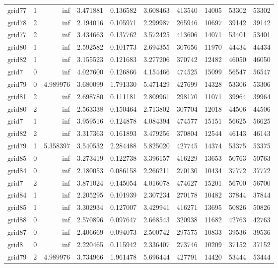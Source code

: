 \begin{longtable}{|l|r|r|r|r|r|r|r|r|r|}
grid77 & 1 & inf & 3.471881 & 0.136582 & 3.608463 & 413540 & 14005 & 53302 & 53302 \\
grid78 & 2 & inf & 2.194016 & 0.105971 & 2.299987 & 265946 & 10697 & 39142 & 39142 \\
grid77 & 2 & inf & 3.434663 & 0.137762 & 3.572425 & 413606 & 14071 & 53401 & 53401 \\
grid80 & 1 & inf & 2.592582 & 0.101773 & 2.694355 & 307656 & 11970 & 44434 & 44434 \\
grid82 & 1 & inf & 3.155523 & 0.121683 & 3.277206 & 370742 & 12482 & 46050 & 46050 \\
grid7 & 0 & inf & 4.027600 & 0.126866 & 4.154466 & 474525 & 15099 & 56547 & 56547 \\
grid79 & 0 & 4.989976 & 3.680099 & 1.791330 & 5.471429 & 427699 & 14328 & 53306 & 53306 \\
grid81 & 2 & inf & 2.698780 & 0.111181 & 2.809961 & 298170 & 11071 & 39964 & 39964 \\
grid80 & 2 & inf & 2.563338 & 0.150464 & 2.713802 & 307704 & 12018 & 44506 & 44506 \\
grid7 & 1 & inf & 3.959516 & 0.124878 & 4.084394 & 474577 & 15151 & 56625 & 56625 \\
grid82 & 2 & inf & 3.317363 & 0.161893 & 3.479256 & 370804 & 12544 & 46143 & 46143 \\
grid79 & 1 & 5.358397 & 3.540532 & 2.284488 & 5.825020 & 427745 & 14374 & 53375 & 53375 \\
grid85 & 0 & inf & 3.273419 & 0.122738 & 3.396157 & 416229 & 13653 & 50763 & 50763 \\
grid84 & 0 & inf & 2.180053 & 0.086158 & 2.266211 & 270130 & 10434 & 37772 & 37772 \\
grid7 & 2 & inf & 3.871024 & 0.145054 & 4.016078 & 474627 & 15201 & 56700 & 56700 \\
grid84 & 1 & inf & 2.205295 & 0.101939 & 2.307234 & 270178 & 10482 & 37844 & 37844 \\
grid85 & 1 & inf & 3.302934 & 0.127007 & 3.429941 & 416271 & 13695 & 50826 & 50826 \\
grid88 & 0 & inf & 2.570896 & 0.097647 & 2.668543 & 320938 & 11682 & 42763 & 42763 \\
grid87 & 0 & inf & 2.406669 & 0.094073 & 2.500742 & 297575 & 10833 & 39536 & 39536 \\
grid8 & 0 & inf & 2.220465 & 0.115942 & 2.336407 & 273746 & 10209 & 37152 & 37152 \\
grid79 & 2 & 4.989976 & 3.734966 & 1.961478 & 5.696444 & 427791 & 14420 & 53444 & 53444 \\

\end{longtable}
